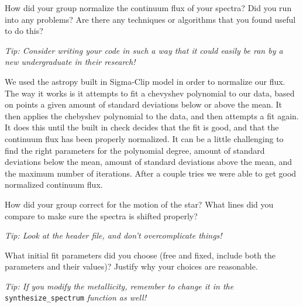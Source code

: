 \documentclass[12pt]{article}
\newenvironment{question}[1]
  {\par\noindent\textbf{#1}\par\vspace{0.5em}}
  {\vspace{1em}}
\newenvironment{answer}
  {\par\noindent\par\vspace{0.5em}\noindent\ignorespaces}
  {\vspace{1em}}
\begin{document}
\begin{answer}
\end{answer}

\vspace{10em}

\begin{question}{}
    How did your group normalize the continuum flux of your spectra? Did you run into any problems? Are there any techniques or algorithms that you found useful to do this?

    \textit{Tip: Consider writing your code in such a way that it could easily be ran by a new undergraduate in their research!}
\end{question}

\begin{answer}
    We used the astropy built in Sigma-Clip model in order to normalize our flux. The way it works is it attempts to fit a chevyshev polynomial to our data, based on points a given amount of standard deviations below or above the mean. It then applies the chebyshev polynomial to the data, and then attempts a fit again. It does this until the built in check decides that the fit is good, and that the continuum flux has been properly normalized. It can be a little challenging to find the right parameters for the polynomial degree, amount of standard deviations below the mean, amount of standard deviations above the mean, and the maximum number of iterations. After a couple tries we were able to get good normalized continuum flux.
\end{answer}

\vspace{10em}

\begin{question}{}
    How did your group correct for the motion of the star? What lines did you compare to make sure the spectra is shifted properly?

    \textit{Tip: Look at the header file, and don't overcomplicate things!} \smiley
\end{question}

\begin{answer}
\end{answer}

\vspace{10em}

\begin{question}{}
    What initial fit parameters did you choose (free and fixed, include both the parameters and their values)? Justify why your choices are reasonable.

    \textit{Tip: If you modify the metallicity, remember to change it in the} \verb|synthesize_spectrum| \textit{function as well!}
\end{question}
\end{document}
